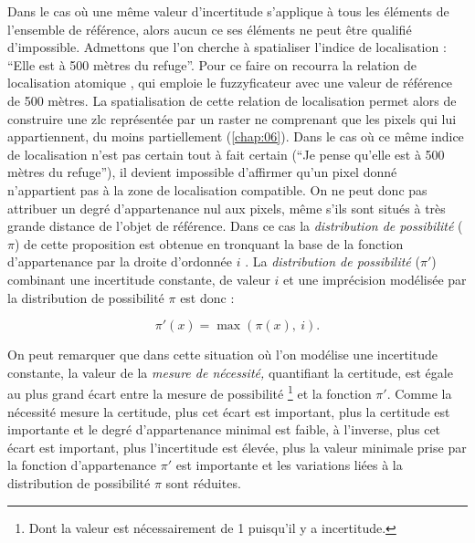 Dans le cas où une même valeur d'incertitude s'applique à tous les
éléments de l'ensemble de référence, alors aucun ce ses éléments ne
peut être qualifié d'impossible.
%
Admettons que l'on cherche à spatialiser l'indice de localisation :
\enquote{Elle est à 500 mètres du refuge}. Pour ce faire on recourra
la relation de localisation atomique
, qui emploie le fuzzyficateur
 avec une valeur de référence de 500 mètres. La
spatialisation de cette relation de localisation permet alors de
construire une \ac{zlc} représentée par un raster ne comprenant que
les pixels qui lui appartiennent, du moins partiellement
(\autoref{chap:06}). Dans le cas où ce même indice de localisation
n'est pas certain tout à fait certain (\eg \enquote{Je pense qu'elle
  est à 500 mètres du refuge}), il devient impossible d'affirmer qu'un
pixel donné n'appartient pas à la zone de localisation compatible. On
ne peut donc pas attribuer un degré d'appartenance nul aux pixels,
même s'ils sont situés à très grande distance de l'objet de
référence. Dans ce cas la \emph{distribution de possibilité} (\(π\))
de cette proposition est obtenue en tronquant la base de la fonction
d'appartenance par la droite d'ordonnée \(i\)
\autocite{Bouchon-Meunier2007}. La \emph{distribution de possibilité}
(\(π'\)) combinant une incertitude constante, de valeur \(i\) et une
imprécision modélisée par la distribution de possibilité \(\pi\) est
donc :

\begin{equation}
  \label{eq:incert_imp}
  π'(x) = \max(π(x),\ i).  
\end{equation}

On peut remarquer que dans cette situation où l'on modélise une
incertitude constante, la valeur de la \emph{mesure de nécessité,}
quantifiant la certitude, est égale au plus grand écart entre la
mesure de possibilité \footnote{Dont la valeur est nécessairement de 1
  puisqu’il y a incertitude.} et la fonction \(\pi'\). Comme la
nécessité mesure la certitude, plus cet écart est important, plus la
certitude est importante et le degré d'appartenance minimal est
faible, à l'inverse, plus cet écart est important, plus l'incertitude
est élevée, plus la valeur minimale prise par la fonction
d'appartenance \(\pi'\) est importante et les variations liées à la
distribution de possibilité \(\pi\) sont réduites.


